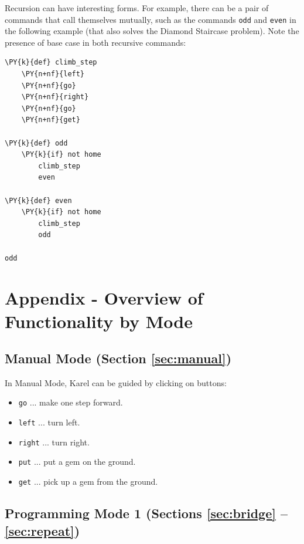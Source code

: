 Recursion can have interesting forms. For example, there can be a pair of commands
that call themselves mutually, such as the commands {\tt odd} and 
{\tt even} in the following example (that also solves the Diamond Staircase
problem). Note the presence of base case in both recursive commands:\\
 
\begin{bbox}
\begin{Verbatim}[commandchars=\\\{\}]
\PY{k}{def} climb_step
    \PY{n+nf}{left}
    \PY{n+nf}{go}
    \PY{n+nf}{right}
    \PY{n+nf}{go}
    \PY{n+nf}{get} 

\PY{k}{def} odd
    \PY{k}{if} not home
        climb_step
        even

\PY{k}{def} even
    \PY{k}{if} not home
        climb_step
        odd
    
odd
\end{Verbatim}
\end{bbox}


\section{Appendix - Overview of Functionality by Mode}\label{sec:newfunc3}

\subsection[\ \ Manual Mode (Section \ref{sec:manual})]{Manual Mode (Section \ref{sec:manual})}

In Manual Mode, Karel can be guided by clicking on buttons:
\begin{itemize}
\item {\tt go} ... make one step forward.
\item {\tt left} ... turn left.
\item {\tt right} ... turn right.
\item {\tt put} ... put a gem on the ground.
\item {\tt get} ... pick up a gem from the ground.
\end{itemize}

\subsection[\ \ Programming Mode 1 (Sections \ref{sec:bridge} -- \ref{sec:repeat})]{Programming Mode 1 (Sections \ref{sec:bridge} -- \ref{sec:repeat})}

